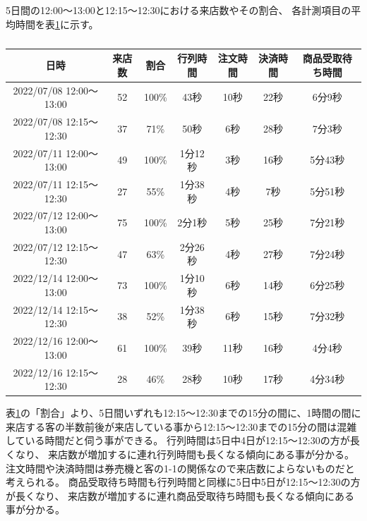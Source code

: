 \documentclass{jsarticle}
\begin{document}
\newpage
5日間の12:00〜13:00と12:15〜12:30における来店数やその割合、
各計測項目の平均時間を表\ref{table6}に示す。

\begin{table}[H]
 \begin{center}
   \caption{}
   \begin{tabular}{|c|c|c||c|c|c|c|} \hline
日時 & 来店数 & 割合 & 行列時間 & 注文時間 & 決済時間 & 商品受取待ち時間 \\ \hline \hline
2022/07/08 12:00〜13:00 & 52 & 100\% & 43秒    & 10秒 & 22秒 & 6分9秒 \\ \hline
2022/07/08 12:15〜12:30 & 37 & 71\%  & 50秒    & 6秒 & 28秒  & 7分3秒 \\ \hline \hline

2022/07/11 12:00〜13:00 & 49 & 100\% & 1分12秒 & 3秒 & 16秒 & 5分43秒 \\ \hline
2022/07/11 12:15〜12:30 & 27 & 55\%  & 1分38秒 & 4秒 & 7秒   & 5分51秒 \\ \hline \hline

2022/07/12 12:00〜13:00 & 75 & 100\% & 2分1秒  & 5秒  & 25秒 & 7分21秒 \\ \hline
2022/07/12 12:15〜12:30 & 47 & 63\%  & 2分26秒 & 4秒 & 27秒  & 7分24秒 \\ \hline \hline

2022/12/14 12:00〜13:00 & 73 & 100\% & 1分10秒 & 6秒 & 14秒 & 6分25秒 \\ \hline
2022/12/14 12:15〜12:30 & 38 & 52\%  & 1分38秒 & 6秒 & 15秒  & 7分32秒 \\ \hline \hline

2022/12/16 12:00〜13:00 & 61 & 100\% & 39秒 & 11秒  & 16秒 & 4分4秒 \\ \hline
2022/12/16 12:15〜12:30 & 28 & 46\%  & 28秒 & 10秒 & 17秒   & 4分34秒 \\ \hline
  \end{tabular}
 \label{table6}
 \end{center}
\end{table}


表\ref{table6}の「割合」より、5日間いずれも12:15〜12:30までの15分の間に、1時間の間に来店する客の半数前後が来店している事から12:15〜12:30までの15分の間は混雑している時間だと伺う事ができる。
行列時間は5日中4日が12:15〜12:30の方が長くなり、
来店数が増加するに連れ行列時間も長くなる傾向にある事が分かる。
注文時間や決済時間は券売機と客の1-1の関係なので来店数によらないものだと考えられる。
商品受取待ち時間も行列時間と同様に5日中5日が12:15〜12:30の方が長くなり、
来店数が増加するに連れ商品受取待ち時間も長くなる傾向にある事が分かる。
\end{document}
